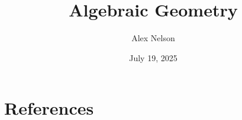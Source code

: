 \documentclass{book}
\title{Algebraic Geometry}
\author{Alex Nelson}
\date{July 19, 2025}
\begin{document}
\frontmatter
\maketitle



\tableofcontents

\mainmatter



















\chapter*{References}


\end{document}

